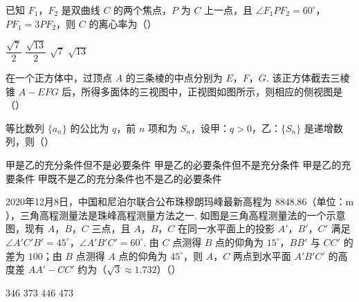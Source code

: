\begin{problem}
已知 \(F_1\)，\(F_2\) 是双曲线 \(C\) 的两个焦点，\(P\) 为 \(C\) 上一点，且 \(\angle F_1PF_2=60^\circ\)，\(PF_1=3PF_2\)，则 \(C\) 的离心率为（\quad）

\choices
    {\(\dfrac{\sqrt{7}}{2}\)}
    {\(\dfrac{\sqrt{13}}{2}\)}
    {\(\sqrt{7}\)}
    {\(\sqrt{13}\)}

\end{problem}

\begin{problem}
在一个正方体中，过顶点 \(A\) 的三条棱的中点分别为 \(E\)，\(F\)，\(G\). 该正方体截去三棱锥 \(A-EFG\) 后，所得多面体的三视图中，正视图如图所示，则相应的侧视图是（\quad）


    {}
    {}
    {}

\end{problem}

\begin{problem}
等比数列 \(\{a_n\}\) 的公比为 \(q\)，前 \(n\) 项和为 \(S_n\)，设甲：\(q>0\)，乙：\(\{S_n\}\) 是递增数列，则（\quad）

\choices
    {甲是乙的充分条件但不是必要条件}
    {甲是乙的必要条件但不是充分条件}
    {甲是乙的充要条件}
    {甲既不是乙的充分条件也不是乙的必要条件}

\end{problem}

\begin{problem}
2020年12月8日，中国和尼泊尔联合公布珠穆朗玛峰最新高程为 \(8848.86\)（单位：\(\mathrm{m}\)），三角高程测量法是珠峰高程测量方法之一. 如图是三角高程测量法的一个示意图，现有 \(A\)，\(B\)，\(C\) 三点，且 \(A\)，\(B\)，\(C\) 在同一水平面上的投影 \(A'\)，\(B'\)，\(C'\) 满足 \(\angle A'C'B'=45^\circ\)，\(\angle A'B'C'=60^\circ\). 由 \(C\) 点测得 \(B\) 点的仰角为 \(15^\circ\)，\(BB'\) 与 \(CC'\) 的差为 \(100\)；由 \(B\) 点测得 \(A\) 点的仰角为 \(45^\circ\)，则 \(A\)，\(C\) 两点到水平面 \(A'B'C'\) 的高度差 \(AA'-CC'\) 约为（\(\sqrt{3}\approx 1.732\)）（\quad）


\choices
    {\(346\)}
    {\(373\)}
    {\(446\)}
    {\(473\)}

\end{problem}

